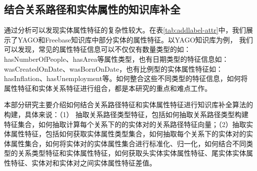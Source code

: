 \subsection{结合关系路径和实体属性的知识库补全}
通过分析可以发现实体属性特征的复杂性较大。在表\ref{tab:addlabel-attr}中，我们展示了YAGO和Freebase知识库中部分实体的属性特征。以YAGO知识库为例，
我们可以发现，常见的属性特征信息可以不仅仅有数量类型的如：hasNumberOfPeople、hasArea等属性类型，也有日期类型的特征信息如：wasCreatedOnDate、wasBornOnDate，也有比例型的实体属性特征如：hasInflation、hasUnemployment等。如何整合这些不同类型的特征信息，如何将属性特征和实体关系特征进行组合，都是本研究的重点和难点工作。

本部分研究主要介绍如何结合关系路径特征和实体属性特征进行知识库补全算法的构建，具体来说：（1）
抽取关系路径类型特征，包括如何抽取关系路径类型构建特征集合，如何抽取计算每个关系下的的实体对的关系路径特征向量；（2）抽取实体属性特征，包括如何获取实体属性类型集合，如何抽取每个关系下的实体对的实体属性集合，如何将实体对的实体属性集合进行标准化、归一化，如何结合不同类型的关系类型特征和实体属性特征，如何获取头实体实体属性特征、尾实体实体属性特征、实体对和实体对之间实体属性特征差值。


